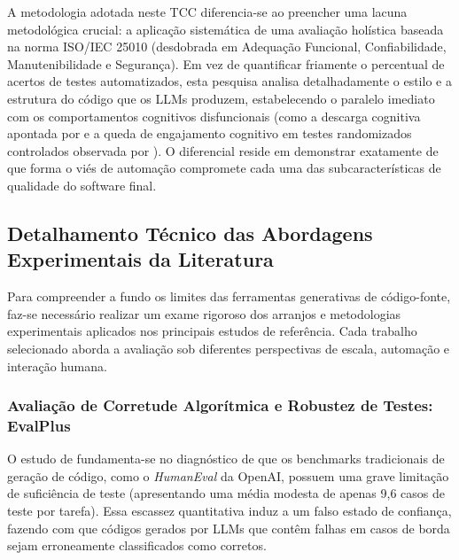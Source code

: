 A metodologia adotada neste TCC diferencia-se ao preencher uma lacuna metodológica crucial: a aplicação sistemática de uma avaliação holística baseada na norma ISO/IEC 25010 (desdobrada em Adequação Funcional, Confiabilidade, Manutenibilidade e Segurança). Em vez de quantificar friamente o percentual de acertos de testes automatizados, esta pesquisa analisa detalhadamente o estilo e a estrutura do código que os LLMs produzem, estabelecendo o paralelo imediato com os comportamentos cognitivos disfuncionais (como a descarga cognitiva apontada por  e a queda de engajamento cognitivo em testes randomizados controlados observada por ). O diferencial reside em demonstrar exatamente de que forma o viés de automação compromete cada uma das subcaracterísticas de qualidade do software final.


\subsection{Detalhamento Técnico das Abordagens Experimentais da Literatura}

Para compreender a fundo os limites das ferramentas generativas de código-fonte, faz-se necessário realizar um exame rigoroso dos arranjos e metodologias experimentais aplicados nos principais estudos de referência. Cada trabalho selecionado aborda a avaliação sob diferentes perspectivas de escala, automação e interação humana.

\subsubsection{Avaliação de Corretude Algorítmica e Robustez de Testes: EvalPlus \cite{liu2023}}

O estudo de  fundamenta-se no diagnóstico de que os benchmarks tradicionais de geração de código, como o \textit{HumanEval} da OpenAI, possuem uma grave limitação de suficiência de teste (apresentando uma média modesta de apenas 9,6 casos de teste por tarefa). Essa escassez quantitativa induz a um falso estado de confiança, fazendo com que códigos gerados por LLMs que contêm falhas em casos de borda sejam erroneamente classificados como corretos.

